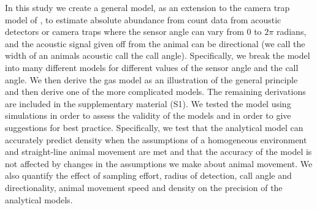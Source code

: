 \documentclass[a4paper,10pt,reqno,oneside]{amsart}
\begin{document}
In this study we create a general model, as an extension to the camera trap model of \cite{rowcliffe2008estimating}, to estimate absolute abundance from count data from acoustic detectors or camera traps  where the sensor angle can vary from 0 to $2\pi$ radians, and the acoustic signal given off from the animal can be directional (we call the width of an animals acoustic call the call angle). Specifically, we break the model into many different models for different values of the sensor angle and the call angle. We then derive the gas model as an illustration of the general principle and then derive one of the more complicated models. The remaining derivations are included in the supplementary material (S1). We tested the model using simulations in order to assess the validity of the models and in order to give suggestions for best practice. Specifically, we test that the analytical model can accurately predict density when the assumptions of a homogeneous environment and straight-line animal movement are met and that the accuracy of the model is not affected by changes in the assumptions we make about animal movement. We also quantify the effect of sampling effort, radius of detection, call angle and directionality, animal movement speed and density on the precision of the analytical models.
\end{document}
